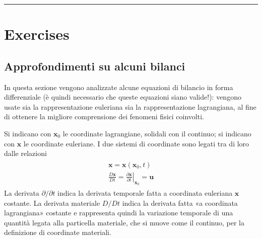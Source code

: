\documentclass[letterpaper,10pt,italian]{jupyterBook}
\begin{document}
\bigskip\hrule\bigskip


\sphinxstepscope


\section{Exercises}
\label{\detokenize{polimi/fluidmechanics-ita/template/capitoli/04_bilanci/exercises:exercises}}\label{\detokenize{polimi/fluidmechanics-ita/template/capitoli/04_bilanci/exercises:fluid-mechanics-balances-exercises}}\label{\detokenize{polimi/fluidmechanics-ita/template/capitoli/04_bilanci/exercises::doc}}
\sphinxstepscope


\subsection{Approfondimenti su alcuni bilanci}
\label{\detokenize{polimi/fluidmechanics-ita/template/capitoli/04_bilanci/0410in:approfondimenti-su-alcuni-bilanci}}\label{\detokenize{polimi/fluidmechanics-ita/template/capitoli/04_bilanci/0410in:fluid-mechanics-balances-in-depth}}\label{\detokenize{polimi/fluidmechanics-ita/template/capitoli/04_bilanci/0410in::doc}}
\sphinxAtStartPar
In questa sezione vengono analizzate alcune equazioni di bilancio in
forma differenziale (è quindi necessario che queste equazioni siano
valide!): vengono usate sia la rappresentazione euleriana sia la
rappresentazione lagrangiana, al fine di ottenere la migliore
comprensione dei fenomeni fisici coinvolti.

\sphinxAtStartPar
Si indicano con \(\bm{x}_0\) le coordinate lagrangiane, solidali con il
continuo; si indicano con \(\bm{x}\) le coordinate euleriane. I due
sistemi di coordinate sono legati tra di loro dalle relazioni
\begin{equation*}
\begin{split}\begin{aligned}
 \bm{x} = \bm{x}(\bm{x}_0,t) \\
 \frac{D \bm{x}}{D t} = \left.\frac{\partial \bm{x}}{\partial t}\right|_{\bm{x}_0} = 
 \bm{u}
\end{aligned}\end{split}
\end{equation*}
\sphinxAtStartPar
La derivata \(\partial/\partial t\) indica la derivata
temporale fatta a coordinata euleriana \(\bm{x}\) costante. La derivata
materiale \(D/D t\) indica la derivata fatta «a coordinata lagrangiana»
costante e rappresenta quindi la variazione temporale di una quantità
legata alla particella materiale, che si muove come il continuo, per la
definizione di coordinate materiali.
\end{document}
